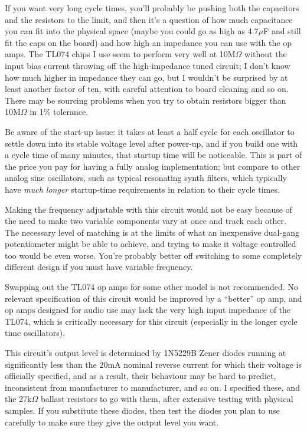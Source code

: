 If you want very long cycle times, you'll probably be pushing both the
capacitors and the resistors to the limit, and then it's a question of how
much capacitance you can fit into the physical space (maybe you could go as
high as 4.7$\mu$F and still fit the caps on the board) and how high an
impedance you can use with the op amps.  The TL074 chips I use seem to
perform very well at 10M$\Omega$ without the input bias
current throwing off the high-impedance tuned circuit; I don't know how much
higher in impedance they can go, but I wouldn't be surprised by at least
another factor of ten, with careful attention to board cleaning and so on. 
There may be sourcing problems when you try to obtain resistors bigger than
10M$\Omega$ in 1\% tolerance.

Be aware of the start-up issue: it takes at least a half cycle for each
oscillator to settle down into its stable voltage level after power-up, and
if you build one with a cycle time of many minutes, that startup time will
be noticeable.  This is part of the price you pay for having a fully analog
implementation; but compare to other analog sine oscillators, such as
typical resonating synth filters, which typically have \emph{much longer}
startup-time requirements in relation to their cycle times.

Making the frequency adjustable with this circuit would not be easy because
of the need to make two variable components vary at once and track each
other.  The necessary level of matching is at the limits of what an
inexpensive dual-gang potentiometer might be able to achieve, and trying to
make it voltage controlled too would be even worse.  You're probably better
off switching to some completely different design if you must have variable
frequency.

Swapping out the TL074 op amps for some other model is not recommended.  No
relevant specification of this circuit would be improved by a ``better'' op
amp, and op amps designed for audio use may lack the very high input
impedance of the TL074, which is critically necessary for this circuit
(especially in the longer cycle time oscillators).

This circuit's output level is determined by 1N5229B Zener diodes running at
significantly less than the 20mA nominal reverse current for which their
voltage is officially specified, and as a result, their behaviour may be
hard to predict, inconsistent from manufacturer to manufacturer, and so on. 
I specified these, and the 27k$\Omega$ ballast resistors to go with them,
after extensive testing with physical samples.  If you substitute these
diodes, then test the diodes you plan to use carefully to make sure they
give the output level you want.

